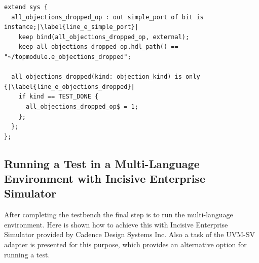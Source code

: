 \lstset{language=e, numbers = left, escapechar=|, breaklines=true}
\begin{lstlisting}[frame=htrbl, caption={\textit{e}: signaling master component that all objections are dropped},
label={lst:e_slave_test_end}]
extend sys {
  all_objections_dropped_op : out simple_port of bit is instance;|\label{line_e_simple_port}|
    keep bind(all_objections_dropped_op, external);
    keep all_objections_dropped_op.hdl_path() == "~/topmodule.e_objections_dropped";
    
  all_objections_dropped(kind: objection_kind) is only {|\label{line_e_objections_dropped}|
    if kind == TEST_DONE {
      all_objections_dropped_op$ = 1;
    };
  };
};
\end{lstlisting}
\subsection{Running a Test in a Multi-Language Environment with Incisive Enterprise Simulator}

After completing the testbench the final step is to run the multi-language environment. Here is shown how to achieve
this with Incisive Enterprise Simulator provided by Cadence Design Systems Inc. Also a task of the
UVM-SV adapter is presented for this purpose, which provides an alternative option for running a test.

